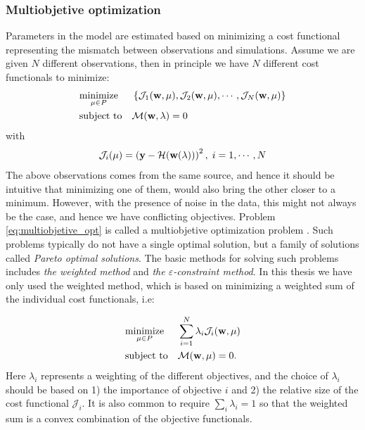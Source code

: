 \subsubsection{Multiobjetive optimization}
Parameters in the model are estimated based on minimizing a cost
functional representing the mismatch between observations and
simulations. Assume we are given $N$ different observations, then in
principle we have $N$ different cost functionals to minimize:
\begin{equation}
  \begin{aligned}
    \label{eq:multiobjetive_opt}
    & \underset{\mu \in P}{\text{minimize}}
    & &  \left\{ \mathcal{J}_1(\mathbf{w}, \mu), \mathcal{J}_2(\mathbf{w}, \mu), \cdots, \mathcal{J}_N(\mathbf{w}, \mu) \right\} \\
    & \text{subject to}
    & &\mathcal{M}(\mathbf{w}, \lambda) = 0
  \end{aligned}
\end{equation}
with
\begin{align}
  \mathcal{J}_i(\mu) = \left( \mathbf{y} - \mathcal{H}(\mathbf{w}(\lambda)) \right)^2, \; i = 1,\cdots, N
\end{align}
The above observations comes from the same source, and hence it should
be intuitive that minimizing one of them, would also bring the other
closer to a minimum. However, with the presence of noise in the data,
this might not always be the case, and hence we have conflicting
objectives. Problem \eqref{eq:multiobjetive_opt} is called a
multiobjetive optimization problem \cite{deb2016multi}. Such problems
typically do not have a single optimal solution, but a family of
solutions called \emph{Pareto optimal solutions}. The basic methods for
solving such problems includes \emph{the weighted method} and \emph{the
  $\varepsilon$-constraint method}. In this thesis we have only used
the weighted method, which is based on minimizing a weighted sum of
the individual cost functionals, i.e:

\begin{equation}
  \begin{aligned}
    \label{eq:weighted_method}
    & \underset{\mu \in P}{\text{minimize}}
    & &  \sum_{i=1}^N \lambda_i \mathcal{J}_i(\mathbf{w}, \mu) \\
    & \text{subject to}
    & &\mathcal{M}(\mathbf{w}, \mu) = 0.
  \end{aligned}
\end{equation}
Here $\lambda_i$ represents a weighting of the different objectives,
and the choice of $\lambda_i$ should be based on 1) the importance of
objective $i$ and 2) the relative size of the cost functional
$\mathcal{J}_i$. It is also common to require $\sum_i \lambda_i = 1$
so that the weighted sum is a convex combination of the objective
functionals.



